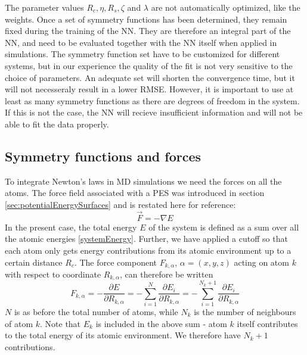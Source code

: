 \documentclass[twoside,english]{uiofysmaster}
\begin{document}
The parameter values $R_c, \eta, R_s, \zeta$ and $\lambda$ are not automatically optimized, like the weights. 
Once a set of symmetry functions has been determined, they remain fixed during the training of the NN. They are therefore
an integral part of the NN, and need to be evaluated together with the NN itself when applied in simulations. 
The symmetry function set have to be customized for different systems, but in our experience the quality of the fit 
is not very sensitive to the choice of parameters. An adequate set will shorten the convergence time, but it will not 
necesseraly result in a lower RMSE. 
However, it is important to use at least as many symmetry functions as there are degrees of freedom in the system.
If this is not the case, the NN will recieve insufficient information and will not be able to fit the data properly. 

\subsection{Symmetry functions and forces}
To integrate Newton's laws in MD simulations we need the forces on all the atoms. The force field associated with a PES
was introduced in section \ref{sec:potentialEnergySurfaces} and is restated here for reference:
\begin{equation}
 \vec{F} = -\nabla E
 \label{forcePES2}
\end{equation}
In the present case, the total energy $E$ of the system is defined as a sum over all the atomic energies \eqref{systemEnergy}. 
Further, we have applied a cutoff so that each atom only gets energy contributions from its atomic environment up 
to a certain distance $R_c$.
The force component $F_{k,\alpha}$, $\alpha = (x,y,z)$ acting on atom $k$ with respect to coordinate $R_{k,\alpha}$,
can therefore be written \cite{Behler11symmetry}
\begin{equation}
 F_{k,\alpha} = -\frac{\partial E}{\partial R_{k,\alpha}} = -\sum_{i=1}^N\frac{\partial E_i}{\partial R_{k,\alpha}}
 = -\sum_{i=1}^{N_k+1}\frac{\partial E_i}{\partial R_{k,\alpha}}
 \label{forceAtomk}
\end{equation}
$N$ is as before the total number of atoms, while $N_k$ is the number of neighbours of atom $k$. 
Note that $E_k$ is included in the above sum - atom $k$ itself contributes to the total energy of its atomic
environment. We therefore have $N_k+1$ contributions. 
\end{document}

